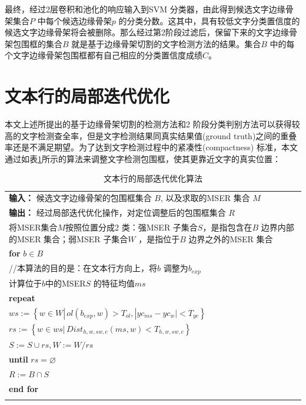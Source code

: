         最终，经过2层卷积和池化的响应输入到SVM 分类器，由此得到候选文字边缘骨架集合$P$ 中每个候选边缘骨架$p$ 的分类分数。这其中，具有较低文字分类置信度的候选文字边缘骨架将会被删除。那么经过第2阶段过滤后，保留下来的文字边缘骨架包围框的集合$B$ 就是基于边缘骨架切割的文字检测方法的结果。集合$B$ 中的每个文字边缘骨架包围框都有自己相应的分类置信度成绩$C$。

    \section{文本行的局部迭代优化}

    本文上述所提出的基于边缘骨架切割的检测方法和2 阶段分类判别方法可以获得较高的文字检测查全率，但是文字检测结果同真实结果值(ground truth)之间的重叠率还是不满足期望。为了达到文字检测过程中的紧凑性(compactness) 标准，本文通过如表\ref{tab.c3_algori_ilr}所示的算法来调整文字检测包围框，使其更靠近文字的真实位置：
        
    \begin{table}[!h]
    \renewcommand\arraystretch{1.5}
    \centering
    \caption{文本行的局部迭代优化算法}
    \begin{tabular}{p{}}
    \toprule
    \textbf{输入：} 候选文字边缘骨架的包围框集合 $B$, 以及求取的MSER 集合 $M$\\
    \textbf{输出：} 经过局部迭代优化操作，对定位调整后的包围框集合 $R$\\
    \midrule
     将MSER集合$M$按照位置分成2 类：强MSER 子集合$S$，是指包含在$B$ 边界内部的MSER 集合；弱MSER 子集合$W$ ，是指位于$B$ 边界之外的MSER 集合\\
     \textbf{for} {$b \in B$}\\
    \qquad //本算法的目的是：在文本行方向上，将$b$ 调整为$b_{exp}$ \\
    \qquad 计算位于$b$中的MSER$S$ 的特征均值$ms$\\
    \qquad \textbf{repeat}\\
    \qquad \qquad $ws:=\left\{ w \in W |\,ol(b_{exp},w)>T_{ol}, | yc_{ms}-yc_w|<T_{yc} \right\}$ \\
    \qquad \qquad $rs:=\left\{ w \in ws |\,Dist_{h,w,sw,c}(ms,w)<T_{h,w,sw,c} \right\}$ \\
    \qquad \qquad $S:=S\cup rs,W:=W / rs$\\
    \qquad \textbf{until} $rs=\varnothing$ \\
    \qquad $R:=B \cap S$ \\
    \textbf{end for} \\
    \bottomrule
    \label{tab.c3_algori_ilr}
    \end{tabular}
    \end{table}
    
